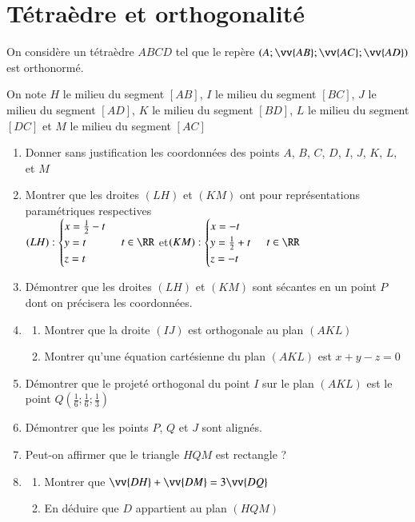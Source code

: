 \documentclass[oneside,12pt]{article}
\let\oldsection\section
\renewcommand{\section}{\newpage\oldsection}
\begin{document}
\section{Tétraèdre et orthogonalité}
On considère un tétraèdre $ABCD$ tel que le repère $(A;\vv{AB};\vv{AC};\vv{AD})$ est orthonormé.

On note $H$ le milieu du segment $[AB]$, $I$ le milieu du segment $[BC]$, $J$ le milieu du segment $[AD]$, $K$ le milieu du segment $[BD]$, $L$ le milieu du segment $[DC]$ et $M$ le milieu du segment $[AC]$

\begin{enumerate}
    \item Donner sans justification les coordonnées des points $A$, $B$, $C$, $D$, $I$, $J$, $K$, $L$, et $M$
    \item Montrer que les droites $(LH)$ et $(KM)$ ont pour représentations paramétriques respectives \\
    $(LH):\begin{cases}x=\frac{1}{2}-t\\y=t\\z=t\end{cases}\, t\in\RR$ \quad et\quad $(KM):\begin{cases}x=-t\\y=\frac{1}{2}+t\\z=-t\end{cases}\, t\in\RR$ 
    \item Démontrer que les droites $(LH)$ et $(KM)$ sont sécantes en un point $P$ dont on précisera les coordonnées.
    \item \begin{enumerate}
        \item Montrer que la droite $(IJ)$ est orthogonale au plan $(AKL)$
        \item Montrer qu'une équation cartésienne du plan $(AKL)$ est $x+y-z=0$
    \end{enumerate}
    \item Démontrer que le projeté orthogonal du point $I$ sur le plan $(AKL)$ est le point $Q\left(\frac{1}{6};\frac{1}{6};\frac{1}{3}\right)$
    \item Démontrer que les points $P$, $Q$ et $J$ sont alignés.
    \item Peut-on affirmer que le triangle $HQM$ est rectangle ?
    \item \begin{enumerate}
        \item Montrer que $\vv{DH}+\vv{DM}=3\vv{DQ}$
        \item En déduire que $D$ appartient au plan $(HQM)$
    \end{enumerate}
\end{enumerate}
\end{document}
